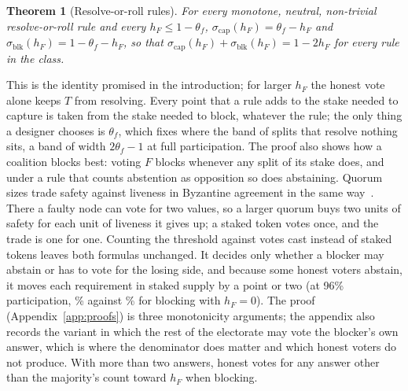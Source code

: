 \documentclass[conference,compsoc]{IEEEtran}
\newtheorem{theorem}{Theorem}
\newcommand{\hF}{h_{F}}
\newcommand{\sigcap}{\sigma_{\mathrm{cap}}}
\newcommand{\sigblk}{\sigma_{\mathrm{blk}}}
\begin{document}
\begin{theorem}[Resolve-or-roll rules]
\label{thm:tally}
For every monotone, neutral, non-trivial resolve-or-roll rule and every $\hF \le 1 - \theta_f$, $\sigcap(\hF) = \theta_f - \hF$ and $\sigblk(\hF) = 1 - \theta_f - \hF$, so that $\sigcap(\hF) + \sigblk(\hF) = 1 - 2\hF$ for every rule in the class.
\end{theorem}
 This is the identity promised in the introduction; for larger $\hF$ the honest vote alone keeps $T$ from resolving. Every point that a rule adds to the stake needed to capture is taken from the stake needed to block, whatever the rule; the only thing a designer chooses is $\theta_f$, which fixes where the band of splits that resolve nothing sits, a band of width $2\theta_f - 1$ at full participation. The proof also shows how a coalition blocks best: voting $F$ blocks whenever any split of its stake does, and under a rule that counts abstention as opposition so does abstaining. Quorum sizes trade safety against liveness in Byzantine agreement in the same way~\cite{malkhi2019}. There a faulty node can vote for two values, so a larger quorum buys two units of safety for each unit of liveness it gives up; a staked token votes once, and the trade is one for one. Counting the threshold against votes cast instead of staked tokens leaves both formulas unchanged. It decides only whether a blocker may abstain or has to vote for the losing side, and because some honest voters abstain, it moves each requirement in staked supply by a point or two (at 96\% participation, \stakedTriggerBlockPct\% against \votesTriggerBlockPct\% for blocking with $\hF = 0$). The proof (Appendix~\ref{app:proofs}) is three monotonicity arguments; the appendix also records the variant in which the rest of the electorate may vote the blocker's own answer, which is where the denominator does matter and which honest voters do not produce. With more than two answers, honest votes for any answer other than the majority's count toward $\hF$ when blocking.
\end{document}
